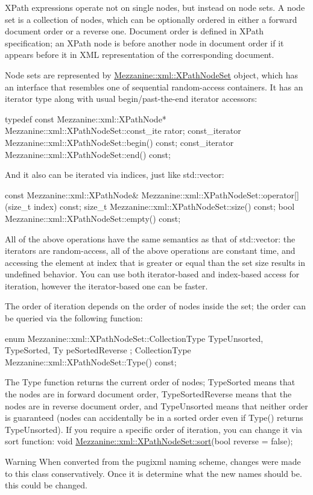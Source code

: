  \par
 XPath expressions operate not on single nodes, but instead on node sets. A node set is a collection of nodes, which can be optionally ordered in either a forward document order or a reverse one. Document order is defined in XPath specification; an XPath node is before another node in document order if it appears before it in XML representation of the corresponding document. \par
 \par
 Node sets are represented by \hyperlink{classMezzanine_1_1xml_1_1XPathNodeSet}{Mezzanine::xml::XPathNodeSet} object, which has an interface that resembles one of sequential random-\/access containers. It has an iterator type along with usual begin/past-\/the-\/end iterator accessors: 
\begin{DoxyCode}
 typedef const Mezzanine::xml::XPathNode* Mezzanine::xml::XPathNodeSet::const_ite
      rator;
 const_iterator Mezzanine::xml::XPathNodeSet::begin() const;
 const_iterator Mezzanine::xml::XPathNodeSet::end() const;
\end{DoxyCode}
 And it also can be iterated via indices, just like std::vector: 
\begin{DoxyCode}
 const Mezzanine::xml::XPathNode& Mezzanine::xml::XPathNodeSet::operator[](size_t
       index) const;
 size_t Mezzanine::xml::XPathNodeSet::size() const;
 bool Mezzanine::xml::XPathNodeSet::empty() const;
\end{DoxyCode}
 All of the above operations have the same semantics as that of std::vector: the iterators are random-\/access, all of the above operations are constant time, and accessing the element at index that is greater or equal than the set size results in undefined behavior. You can use both iterator-\/based and index-\/based access for iteration, however the iterator-\/based one can be faster. \par
 \par
 The order of iteration depends on the order of nodes inside the set; the order can be queried via the following function: 
\begin{DoxyCode}
 enum Mezzanine::xml::XPathNodeSet::CollectionType { TypeUnsorted, TypeSorted, Ty
      peSortedReverse };
 CollectionType Mezzanine::xml::XPathNodeSet::Type() const;
\end{DoxyCode}
 The Type function returns the current order of nodes; TypeSorted means that the nodes are in forward document order, TypeSortedReverse means that the nodes are in reverse document order, and TypeUnsorted means that neither order is guaranteed (nodes can accidentally be in a sorted order even if Type() returns TypeUnsorted). If you require a specific order of iteration, you can change it via sort function: void \hyperlink{classMezzanine_1_1xml_1_1XPathNodeSet_a5c276fb12b0536d15c8cf3d12af6b8e4}{Mezzanine::xml::XPathNodeSet::sort}(bool reverse = false); \begin{DoxyWarning}{Warning}
When converted from the pugixml naming scheme, changes were made to this class conservatively. Once it is determine what the new names should be. this could be changed.
\end{DoxyWarning}
